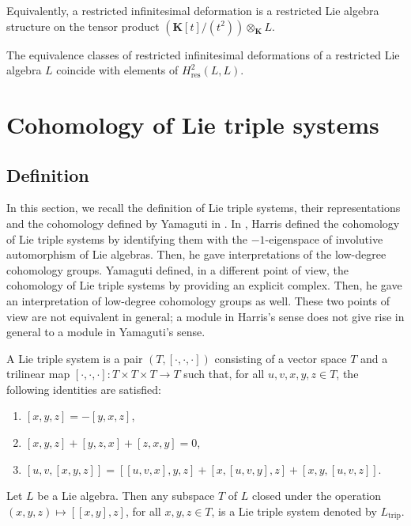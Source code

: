 \documentclass[11pt, twoside]{article}
\begin{document}
Equivalently, a restricted infinitesimal deformation is a restricted Lie algebra structure on the tensor product $(\mathbf{K}[t]/(t^2))\otimes_\mathbf{K}L $.

\begin{thm}\cite{E96}
    The equivalence classes of restricted infinitesimal deformations of a restricted Lie algebra $L$ coincide with elements of $H_\mathrm{res}^2(L,L)$.
\end{thm}
 
\section{Cohomology of Lie triple systems}\label{s4}

\subsection{Definition}

In this section, we recall the definition of Lie triple systems, their representations and the cohomology defined by Yamaguti in \cite{Y60}.
In \cite{H60}, Harris defined the cohomology of Lie triple systems by identifying them with the $-1$-eigenspace of involutive automorphism of Lie algebras. Then, he gave interpretations of the low-degree cohomology groups. Yamaguti defined, in a different point of view, the cohomology of Lie triple systems by providing  an explicit complex. Then, he gave an interpretation of low-degree cohomology groups as well. These two points of view are not equivalent in general; a module in Harris's sense does not give rise in general to a module in Yamaguti's sense.

\begin{defi}
    A Lie triple system is a pair  $(T,[\cdot,\cdot,\cdot]) $ consisting of a vector space $T$ and a trilinear map $[\cdot,\cdot,\cdot]:T\times T\times T\to T $ such that, for all $u,v,x,y,z\in T$, the following identities are satisfied: \begin{enumerate}
        \item  $[x,y,z]= -[y,x,z] $,
        \item  $[x,y,z]+ [y,z,x]+[z,x,y]=0 $,
        \item $[u,v,[x,y,z]]=[[u,v,x],y,z]+ [x,[u,v,y],z] + [x,y,[u,v,z]] $. 
    \end{enumerate} 
\end{defi}

\begin{ex}
     Let $L$ be a Lie algebra. Then any subspace $T$ of $L$ closed under the operation $(x,y,z) \mapsto[[x,y],z] $, for all $x,y,z \in T $, is a Lie triple system denoted by $L_\mathrm{trip} $.
\end{ex}
\end{document}
